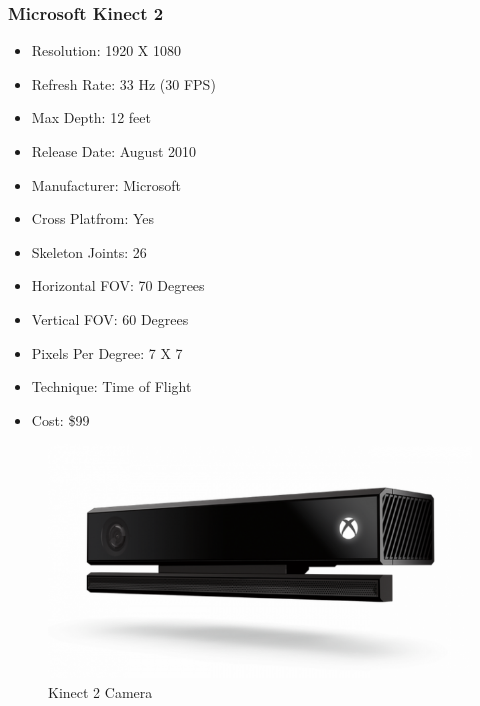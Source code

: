 \documentclass[a4paper,10pt]{article}
\begin{document}
	\subsubsection{Microsoft Kinect 2}
\begin{itemize}
  \item Resolution: 1920 X 1080
  \item Refresh Rate: 33 Hz (30 FPS)
  \item Max Depth: 12 feet
  \item Release Date: August 2010 
  \item Manufacturer: Microsoft
  \item Cross Platfrom: Yes
  \item Skeleton Joints: 26
  \item Horizontal FOV: 70 Degrees
  \item Vertical FOV: 60 Degrees
  \item Pixels Per Degree: 7 X 7
  \item Technique: Time of Flight
  \item Cost: \$99
\end{itemize}
\begin{figure}[H]
	\includegraphics[width=\linewidth,height=\paperheight,keepaspectratio]{kinect2.jpg}
	\caption{Kinect 2 Camera}
	\label{fig:k2Cam}
	\end{figure}
	\pagebreak
	
\end{document}
